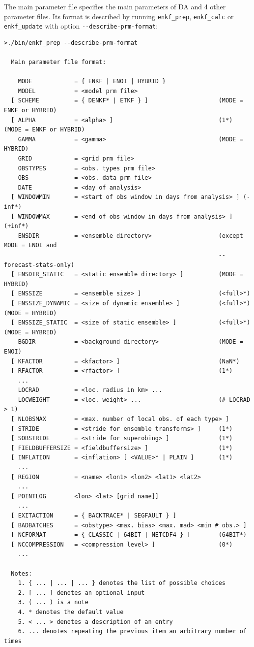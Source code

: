 \documentclass[11pt]{report}
\begin{document}
The main parameter file specifies the main parameters of DA and 4 other parameter files.
Its format is described by running \verb|enkf_prep|, \verb|enkf_calc| or \verb|enkf_update| with option \verb|--describe-prm-format|:
\begin{Verbatim}[frame=single,fontsize=\footnotesize]
>./bin/enkf_prep --describe-prm-format

  Main parameter file format:

    MODE            = { ENKF | ENOI | HYBRID }
    MODEL           = <model prm file>
  [ SCHEME          = { DENKF* | ETKF } ]                    (MODE = ENKF or HYBRID)
  [ ALPHA           = <alpha> ]                              (1*) (MODE = ENKF or HYBRID)
    GAMMA           = <gamma>                                (MODE = HYBRID)
    GRID            = <grid prm file>
    OBSTYPES        = <obs. types prm file>
    OBS             = <obs. data prm file>
    DATE            = <day of analysis>
  [ WINDOWMIN       = <start of obs window in days from analysis> ] (-inf*)
  [ WINDOWMAX       = <end of obs window in days from analysis> ]   (+inf*)
    ENSDIR          = <ensemble directory>                   (except MODE = ENOI and
                                                             --forecast-stats-only)
  [ ENSDIR_STATIC   = <static ensemble directory> ]          (MODE = HYBRID)
  [ ENSSIZE         = <ensemble size> ]                      (<full>*)
  [ ENSSIZE_DYNAMIC = <size of dynamic ensemble> ]           (<full>*) (MODE = HYBRID)
  [ ENSSIZE_STATIC  = <size of static ensemble> ]            (<full>*) (MODE = HYBRID)
    BGDIR           = <background directory>                 (MODE = ENOI)
  [ KFACTOR         = <kfactor> ]                            (NaN*)
  [ RFACTOR         = <rfactor> ]                            (1*)
    ...
    LOCRAD          = <loc. radius in km> ...
    LOCWEIGHT       = <loc. weight> ...                      (# LOCRAD > 1)
  [ NLOBSMAX        = <max. number of local obs. of each type> ]
  [ STRIDE          = <stride for ensemble transforms> ]     (1*)
  [ SOBSTRIDE       = <stride for superobing> ]              (1*)
  [ FIELDBUFFERSIZE = <fieldbuffersize> ]                    (1*)
  [ INFLATION       = <inflation> [ <VALUE>* | PLAIN ]       (1*)
    ...
  [ REGION          = <name> <lon1> <lon2> <lat1> <lat2>
    ...
  [ POINTLOG        <lon> <lat> [grid name]]
    ...
  [ EXITACTION      = { BACKTRACE* | SEGFAULT } ]
  [ BADBATCHES      = <obstype> <max. bias> <max. mad> <min # obs.> ]
  [ NCFORMAT        = { CLASSIC | 64BIT | NETCDF4 } ]        (64BIT*)
  [ NCCOMPRESSION   = <compression level> ]                  (0*)
    ...

  Notes:
    1. { ... | ... | ... } denotes the list of possible choices
    2. [ ... ] denotes an optional input
    3. ( ... ) is a note
    4. * denotes the default value
    5. < ... > denotes a description of an entry
    6. ... denotes repeating the previous item an arbitrary number of times
\end{Verbatim}
\end{document}

